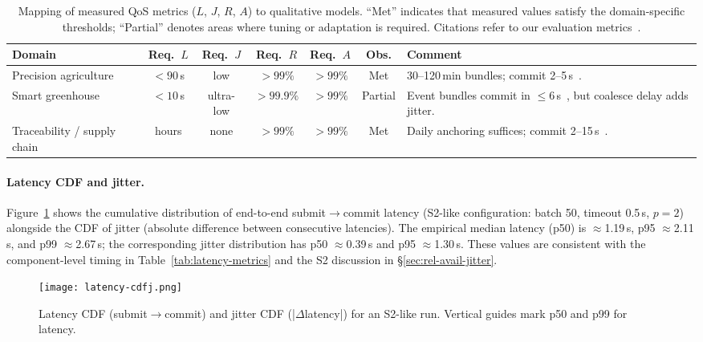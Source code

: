 \documentclass[12pt,onecolumn]{IEEEtran} %
\renewcommand{\arraystretch}{1.2} %
\begin{document}
\begin{table}[htbp]
  \centering
  \caption{Mapping of measured QoS metrics ($L$, $J$, $R$, $A$) to qualitative models. ``Met'' indicates that measured values satisfy the domain-specific thresholds; ``Partial'' denotes areas where tuning or adaptation is required. Citations refer to our evaluation metrics~\cite{ref76853680998234}.}
  \label{tab:qos-map}
  \footnotesize
  \setlength{\tabcolsep}{3.5pt} %
  \renewcommand{\arraystretch}{1.12}
  \begin{tabularx}{\linewidth}{@{}l c c c c c X@{}}
    \toprule
    \textbf{Domain} & \textbf{Req.\ $L$} & \textbf{Req.\ $J$} & \textbf{Req.\ $R$} & \textbf{Req.\ $A$} & \textbf{Obs.} & \textbf{Comment} \\
    \midrule
    Precision agriculture & $<90$\,s & low & $>99\%$ & $>99\%$ & Met &
      30--120\,min bundles; commit 2--5\,s~\cite{ref76853680998234}. \\
    Smart greenhouse & $<10$\,s & ultra-low & $>99.9\%$ & $>99\%$ & Partial &
      Event bundles commit in $\le 6$\,s~\cite{ref76853680998234}, but coalesce delay adds jitter. \\
    Traceability / supply chain & hours & none & $>99\%$ & $>99\%$ & Met &
      Daily anchoring suffices; commit 2--15\,s~\cite{ref76853680998234}. \\
    \bottomrule
  \end{tabularx}
\end{table}
\paragraph{Latency CDF and jitter.}

Figure~\ref{fig:latency-cdf} shows the cumulative distribution of end-to-end submit$\to$commit latency (S2-like configuration: batch 50, timeout 0.5\,s, $p{=}2$) alongside the CDF of jitter (absolute difference between consecutive latencies). The empirical median latency (p50) is \(\approx\)1.19\,s, p95 \(\approx\)2.11\,s, and p99 \(\approx\)2.67\,s; the corresponding jitter distribution has p50 \(\approx\)0.39\,s and p95 \(\approx\)1.30\,s. These values are consistent with the component-level timing in Table~\ref{tab:latency-metrics} and the S2 discussion in \S\ref{sec:rel-avail-jitter}.

\begin{figure}[h]
  \centering
  \texttt{[image: latency-cdfj.png]}
  \caption{Latency CDF (submit$\to$commit) and jitter CDF (|$\Delta$latency|) for an S2-like run. Vertical guides mark p50 and p99 for latency.}
  \label{fig:latency-cdf}
\end{figure}
\end{document}

